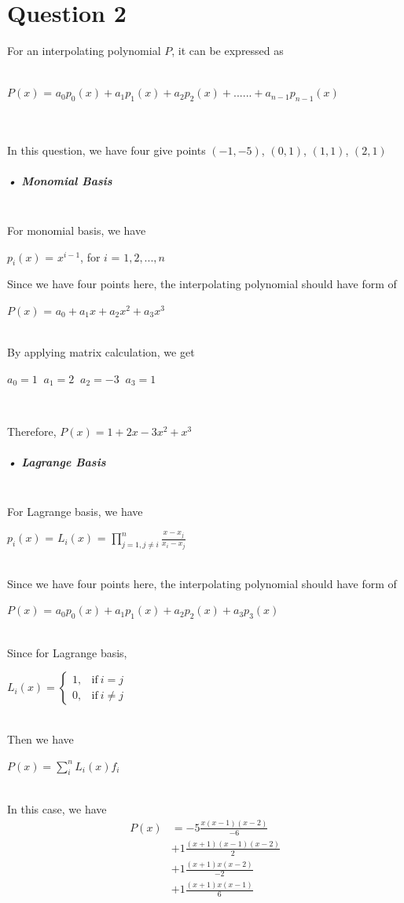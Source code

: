 \documentclass[11pt]{article} %
\begin{document}
\section{Question 2}
For an interpolating polynomial $P$, it can be expressed as\\\\
\centerline{$P(x)$ = $a_{0}p_{0}(x)+a_{1}p_{1}(x)+a_{2}p_{2}(x)+......+a_{n-1}p_{n-1}(x)$}\\\\
In this question, we have four give points $(-1,-5)$, $(0,1)$, $(1,1)$, $(2,1)$
\subparagraph{• Monomial Basis}\mbox{}\\
For monomial basis, we have\\ 
\centerline{$p_{i}(x)$ = $x^{i-1}$, for $i$ = $1,2,...,n$}
Since we have four points here, the interpolating polynomial should have form of\\
\centerline{$P(x)$ = $a_{0} + a_{1}x+ a_{2}x^{2} + a_{3}x^{3}$}\\
By applying matrix calculation, we get\\
\centerline{$a_{0}=1\;\;a_{1}=2\;\;a_{2}=-3\;\;a_{3}=1$}\\
\centerline{Therefore, $P(x) = 1+2x-3x^{2}+x^{3}$}
\subparagraph{• Lagrange Basis}\mbox{}\\
For Lagrange basis, we have\\
\centerline{$p_{i}(x)$ = $L_{i}(x)$ = $\prod_{j=1,j \neq i}^{n}\frac{x-x_{j}}{x_{i}-x_{j}}$}\\
Since we have four points here, the interpolating polynomial should have form of\\
\centerline{$P(x)$ = $a_{0} p_{0}(x)+ a_{1}p_{1}(x)+ a_{2}p_{2}(x) + a_{3}p_{3}(x)$}\\
Since for Lagrange basis,\\
\centerline{$L_{i}(x) = \begin{cases}
      1, & \text{if}\ i=j \\
      0, & \text{if}\ i\neq j
    \end{cases}$}
\centerline{}\\
Then we have\\
\centerline{$P(x) = \sum_{i}^{n}L_{i}(x)f_{i}$}\\
In this case, we have
\begin{equation}
\begin{split}
P(x)&=-5\frac{x(x-1)(x-2)}{-6}\\
	&+1\frac{(x+1)(x-1)(x-2)}{2}\\
	&+1\frac{(x+1)x(x-2)}{-2}\\
	&+1\frac{(x+1)x(x-1)}{6}
\end{split}
\end{equation}
\end{document}
